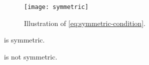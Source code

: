 \begin{figure}[h]
    \centering
    \texttt{[image: symmetric]}
    \caption{
        Illustration of \cref{eq:symmetric-condition}.
    }
    \label{fig:stacking-symmetric}
\end{figure}

\begin{example}
    \SetL is symmetric.
\end{example}

\begin{lemma}
    \Effects is not symmetric.
\end{lemma}

